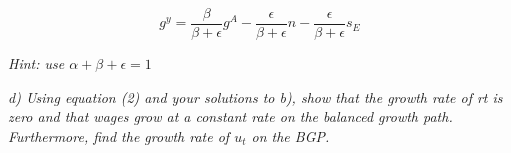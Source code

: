 \documentclass[11pt]{article} %
\begin{document}
\begin{equation}
    g^y=\frac{\beta}{\beta+\epsilon}{g^A}-\frac{\epsilon}{\beta+\epsilon}{n}-\frac{\epsilon}{\beta+\epsilon}{s_E}
\end{equation}

\noindent\textit{Hint: use $\alpha+\beta+\epsilon=1$}



\noindent\textit{d) Using equation (2) and your solutions to b), show that the growth rate of
rt is zero and that wages grow at a constant rate on the balanced growth
path. Furthermore, find the growth rate of $u_t$ on the BGP.}\par
\end{document}
